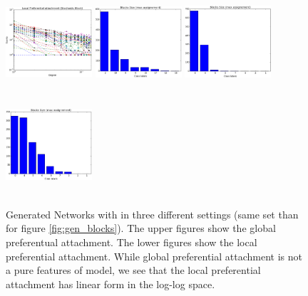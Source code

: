 \begin{figure}[h]
	\endminipage
	\includegraphics[width=3.2cm, height=3.7cm]{img/M_g_regular/figure_3}
	\endminipage
		\vspace{-0.4cm}
	\includegraphics[width=3.2cm, height=3.7cm]{img/M_g_peaks/figure_5}
	\endminipage
	\includegraphics[width=3.2cm, height=3.7cm]{img/M_g_power_law/figure_5} 
	\endminipage
	\includegraphics[width=3.2cm, height=3.7cm]{img/M_g_regular/figure_5}
	\endminipage
	\caption{Generated Networks with in three different settings (same set than for figure \ref{fig:gen_blocks}). The upper figures show the global preferentual attachment. The lower figures show the local preferential attachment. While global preferential attachment is not a pure features of model, we see that the local preferential attachment has linear form in the log-log space.}
	\label{fig:gen_burst_mmsb}
\end{figure}



